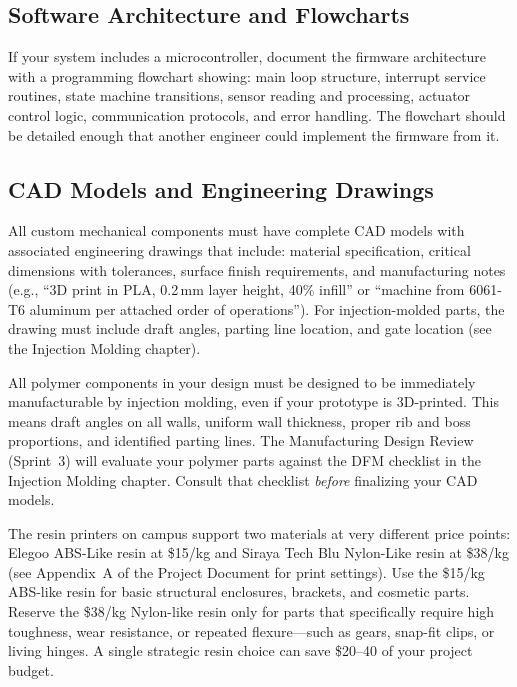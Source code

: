 \documentclass[11pt,letterpaper,twoside,openany]{book}
\begin{document}
\subsection{Software Architecture and Flowcharts}
If your system includes a microcontroller, document the firmware architecture with a programming flowchart showing: main loop structure, interrupt service routines, state machine transitions, sensor reading and processing, actuator control logic, communication protocols, and error handling. The flowchart should be detailed enough that another engineer could implement the firmware from it.

\subsection{CAD Models and Engineering Drawings}
All custom mechanical components must have complete CAD models with associated engineering drawings that include: material specification, critical dimensions with tolerances, surface finish requirements, and manufacturing notes (e.g., ``3D print in PLA, 0.2\,mm layer height, 40\% infill'' or ``machine from 6061-T6 aluminum per attached order of operations''). For injection-molded parts, the drawing must include draft angles, parting line location, and gate location (see the Injection Molding chapter).

\begin{tipbox}
All polymer components in your design must be designed to be immediately manufacturable by injection molding, even if your prototype is 3D-printed. This means draft angles on all walls, uniform wall thickness, proper rib and boss proportions, and identified parting lines. The Manufacturing Design Review (Sprint~3) will evaluate your polymer parts against the DFM checklist in the Injection Molding chapter. Consult that checklist \emph{before} finalizing your CAD models.
\end{tipbox}

\begin{tipbox}
The resin printers on campus support two materials at very different price points: Elegoo ABS-Like resin at \$15/kg and Siraya Tech Blu Nylon-Like resin at \$38/kg (see Appendix~A of the Project Document for print settings). Use the \$15/kg ABS-like resin for basic structural enclosures, brackets, and cosmetic parts. Reserve the \$38/kg Nylon-like resin only for parts that specifically require high toughness, wear resistance, or repeated flexure---such as gears, snap-fit clips, or living hinges. A single strategic resin choice can save \$20--40 of your project budget.
\end{tipbox}
\end{document}
